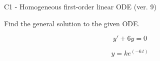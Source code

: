 \begin{exercise}
  \begin{exerciseTitle}C1 - Homogeneous first-order linear ODE (ver. 9)\end{exerciseTitle}
  \begin{exerciseStatement}
    
Find the general solution to the given ODE.

    
\[y'+6y=0\]

  \end{exerciseStatement}
  \begin{exerciseAnswer}
    
\[y= k e^{\left(-6 \, t\right)}\]

  \end{exerciseAnswer}
\end{exercise}